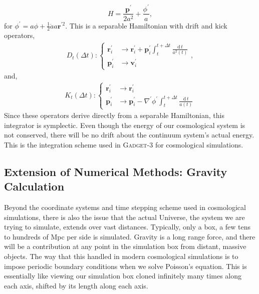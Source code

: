 \begin{equation}
H = \frac{\textbf{p}^\prime}{2 a^2} + \frac{\phi^\prime}{a},
\end{equation}
for $\phi^\prime = a \phi + \frac{1}{2} \ddot{a} a \textbf{r}^{\prime 2}$. This is a separable Hamiltonian with drift and kick operators,
\begin{eqnarray}
D_t(\Delta t) : \begin{cases} 
	  \textbf{r}^\prime_i & \longrightarrow  \textbf{r}^\prime_i + \textbf{p}^\prime_i \int_{t}^{t + \Delta t} \frac{\text{d}\,t}{a^2(t)}\\
      \textbf{p}^\prime_i & \longrightarrow  \textbf{v}^\prime_i 
   \end{cases},
\end{eqnarray}
and,
\begin{eqnarray}
K_t(\Delta t) : \begin{cases} 
	  \textbf{r}^\prime_i & \longrightarrow  \textbf{r}^\prime_i\\
      \textbf{p}^\prime_i & \longrightarrow  \textbf{p}^\prime_i - \nabla^\prime\phi^\prime \int_{t}^{t + \Delta t} \frac{\text{d}\,t}{a(t)}
      \end{cases}
\end{eqnarray}
Since these operators derive directly from a separable Hamiltonian, this integrator is symplectic. Even though the energy of our cosmological system is not conserved, there will be no drift about the continuum system's actual energy. This is the integration scheme used in \textsc{Gadget-3} for cosmological simulations.

\subsection{Extension of Numerical Methods: Gravity Calculation}

Beyond the coordinate systems and time stepping scheme used in cosmological simulations, there is also the issue that the actual Universe, the system we are trying to simulate, extends over vast distances. Typically, only a box, a few tens to hundreds of Mpc per side is simulated. Gravity is a long range force, and there will be a contribution at any point in the simulation box from distant, massive objects. The way that this handled in modern cosmological simulations is to impose periodic boundary conditions when we solve Poisson's equation. This is essentially like viewing our simulation box cloned infinitely many times along each axis, shifted by its length along each axis.

